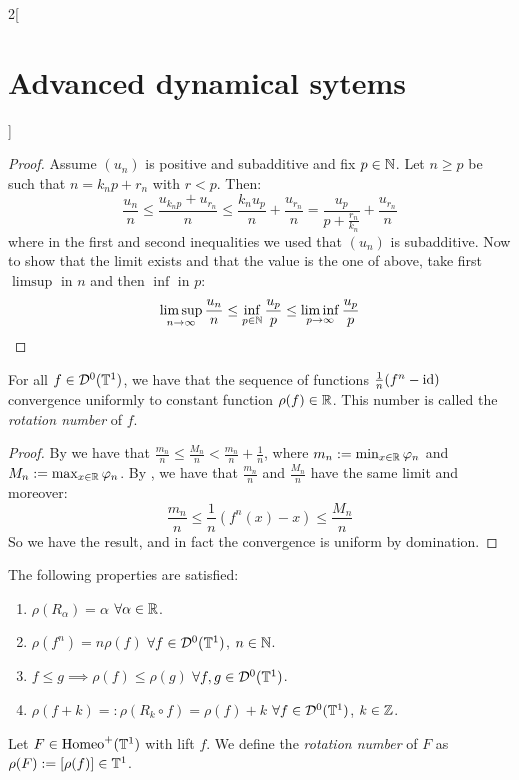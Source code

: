 \documentclass[../../../main_math.tex]{subfiles}
\begin{document}
\begin{multicols}{2}[\section{Advanced dynamical sytems}]
\begin{lemma}
  \end{lemma}
  \begin{proof}
    Assume $(u_n)$ is positive and subadditive and fix $p\in\mathbb{N}$. Let $n\geq p$ be such that $n=k_np+r_n$ with $r<p$. Then:
    $$
      \frac{u_n}{n}\leq \frac{u_{k_np}+u_{r_n}}{n}\leq \frac{k_nu_p}{n}+\frac{u_{r_n}}{n}=\frac{u_p}{p+\frac{r_n}{k_n}}+\frac{u_{r_n}}{n}
    $$
    where in the first and second inequalities we used that $(u_n)$ is subadditive. Now to show that the limit exists and that the value is the one of above, take first $\limsup$ in $n$ and then $\inf$ in $p$:
    $$
      \limsup_{n\to\infty}\frac{u_n}{n}\leq \inf_{p\in\mathbb{N}}\frac{u_p}{p}\leq \liminf_{p\to\infty}\frac{u_p}{p}
    $$
  \end{proof}
  \begin{theorem}
    For all $f\in \mathcal{D}^0(\mathbb{T}^1)$, we have that the sequence of functions $\frac{1}{n}(f^n-\mathrm{id})$ convergence uniformly to constant function $\rho(f)\in\mathbb{R}$. This number is called the \emph{rotation number} of $f$.
  \end{theorem}
  \begin{proof}
    By  we have that $\frac{m_n}{n}\leq \frac{M_n}{n}< \frac{m_n}{n}+\frac{1}{n}$, where $m_n:= \min_{x\in\mathbb{R}}\varphi_n$ and $M_n:= \max_{x\in\mathbb{R}}\varphi_n$. By , we have that $\frac{m_n}{n}$ and $\frac{M_n}{n}$ have the same limit and moreover:
    $$
      \frac{m_n}{n}\leq \frac{1}{n}(f^n(x)-x)\leq \frac{M_n}{n}
    $$
    So we have the result, and in fact the convergence is uniform by domination.
  \end{proof}
  \begin{proposition}
    The following properties are satisfied:
    \begin{enumerate}
      \item $\rho(R_\alpha)=\alpha$ $\forall\alpha\in\mathbb{R}$.
      \item $\rho(f^n)=n\rho(f)$ $\forall f\in \mathcal{D}^0(\mathbb{T}^1)$, $n\in\mathbb{N}$.
      \item $f\leq g\implies \rho(f)\leq \rho(g)$ $\forall f,g\in \mathcal{D}^0(\mathbb{T}^1)$.
      \item $\rho(f+k)=:\rho(R_k\circ f)=\rho(f) + k$ $\forall f\in \mathcal{D}^0(\mathbb{T}^1)$, $k\in\mathbb{Z}$.
    \end{enumerate}
  \end{proposition}
  \begin{definition}
    Let $F\in \mathrm{Homeo}^+(\mathbb{T}^1)$ with lift $f$. We define the \emph{rotation number} of $F$ as $\rho(F):=[\rho(f)]\in \mathbb{T}^1$.

\end{definition}
\end{multicols}
\end{document}
